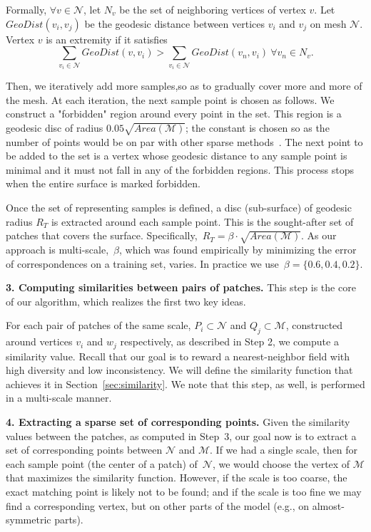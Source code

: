 Formally, $\forall v \in \mathcal{N}$,  let $N_v$ be the set of neighboring vertices of vertex $v$.
Let $GeoDist(v_i, v_j)$ be the geodesic distance between vertices $v_i$ and $v_j$ on mesh $\mathcal{N}$. 
Vertex $v$ is an extremity if it satisfies
\begin{equation}
	\sum_{v_i\in \mathcal{N}} GeoDist(v,v_i)>\sum_{v_i\in \mathcal{N}} GeoDist(v_n, v_i)~\forall v_n\in N_v.
	\label{eq:extremities}
\end{equation}

Then, we iteratively add more samples,so as to gradually cover more and more of the mesh.
At each iteration, the next sample point is chosen as follows.
We construct a "forbidden" region around every point in the set.
This region is a geodesic disc of radius $ 0.05\sqrt{Area(\mathcal{M})}$; the constant is chosen so as the number of points would be on par with other sparse methods~\cite{cosmo2016shrec}.
The next point to be added to the set is a vertex whose geodesic distance to any sample point is minimal and it must not fall in any of the forbidden regions.
This process stops when the entire surface is marked forbidden.

Once the set of representing samples is defined, a disc (sub-surface) of geodesic radius $R_T$ is extracted around each sample point.
This is the sought-after set of patches that covers the surface.
Specifically,~$R_T=\beta\cdot \sqrt{Area(\mathcal{M})}$.
As our approach is multi-scale,~$\beta$, which was found empirically by minimizing the error of correspondences on a training set, varies.
In practice we use~$\beta=\{0.6,0.4,0.2\}$.




\vspace{0.1in}
\noindent
{\textbf {3. Computing similarities between pairs of patches.}}
This step is the core of our algorithm, which realizes the first two key ideas.

For each pair of patches of the same scale, $P_i \subset \mathcal{N}$ and $Q_j \subset \mathcal{M}$, constructed around vertices $v_i$ and $w_j$ respectively, as described in Step 2, we compute a similarity value.
%
Recall that our goal is to reward a nearest-neighbor field with high diversity and low inconsistency.
We will define the similarity function that achieves it  in Section~\ref{sec:similarity}.
We note that this step, as well, is performed in a multi-scale manner.


\vspace{0.1in}
\noindent
{\textbf {4. Extracting a sparse set of corresponding points.}}
Given the similarity values between the patches, as computed in Step~3, our goal now is to extract a set of corresponding points between  $\mathcal{N}$ and $\mathcal{M}$.
If we had a single scale, then for each sample point (the center of a patch) of~$\mathcal{N}$, we would choose the vertex of $\mathcal{M}$ that maximizes the similarity function.
However, if the scale is too coarse, the exact matching point is likely not to be found; and if the scale is too fine we may find a corresponding vertex, but on other parts of the model (e.g., on almost-symmetric parts).

